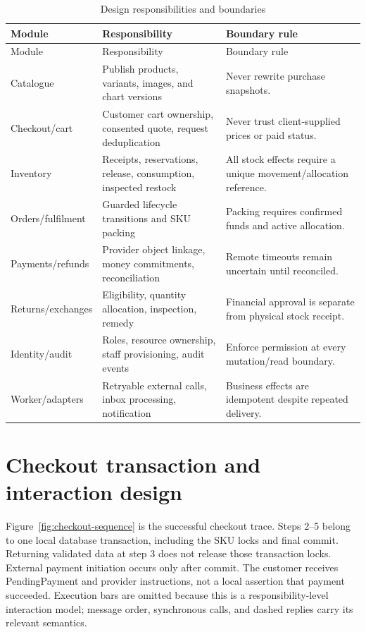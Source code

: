 \begin{longtable}{P{.23\linewidth}P{.39\linewidth}P{.27\linewidth}}
\caption{Design responsibilities and boundaries}\label{tab:modules}\\
\toprule Module & Responsibility & Boundary rule \\\midrule\endfirsthead
\toprule Module & Responsibility & Boundary rule \\\midrule\endhead
Catalogue & Publish products, variants, images, and chart versions & Never rewrite purchase snapshots.\\
Checkout/cart & Customer cart ownership, consented quote, request deduplication & Never trust client-supplied prices or paid status.\\
Inventory & Receipts, reservations, release, consumption, inspected restock & All stock effects require a unique movement/allocation reference.\\
Orders/fulfilment & Guarded lifecycle transitions and SKU packing & Packing requires confirmed funds and active allocation.\\
Payments/refunds & Provider object linkage, money commitments, reconciliation & Remote timeouts remain uncertain until reconciled.\\
Returns/exchanges & Eligibility, quantity allocation, inspection, remedy & Financial approval is separate from physical stock receipt.\\
Identity/audit & Roles, resource ownership, staff provisioning, audit events & Enforce permission at every mutation/read boundary.\\
Worker/adapters & Retryable external calls, inbox processing, notification & Business effects are idempotent despite repeated delivery.\\
\bottomrule
\end{longtable}

\section{Checkout transaction and interaction design}
Figure~\ref{fig:checkout-sequence} is the successful checkout trace. Steps 2--5 belong to one local database transaction, including the SKU locks and final commit. Returning validated data at step 3 does not release those transaction locks. External payment initiation occurs only after commit. The customer receives PendingPayment and provider instructions, not a local assertion that payment succeeded. Execution bars are omitted because this is a responsibility-level interaction model; message order, synchronous calls, and dashed replies carry its relevant semantics.

